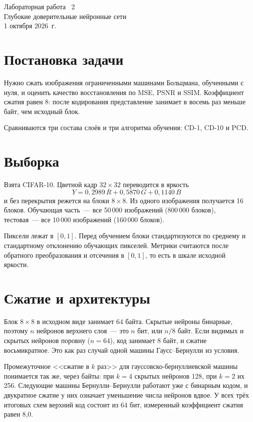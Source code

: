 \documentclass[12pt,a4paper]{article}
\begin{document}
\begin{center}
{\Large Лабораторная работа \textnumero~2}\\[0.4em]
{\large Глубокие доверительные нейронные сети}\\[0.6em]
1 октября 2026~г.
\end{center}

\section{Постановка задачи}

Нужно сжать изображения ограниченными машинами Больцмана, обученными с нуля, и оценить качество восстановления по MSE, PSNR и SSIM. Коэффициент сжатия равен 8: после кодирования представление занимает в восемь раз меньше байт, чем исходный блок.

Сравниваются три состава слоёв и три алгоритма обучения: CD-1, CD-10 и PCD.

\section{Выборка}

Взята CIFAR-10. Цветной кадр $32\times32$ переводится в яркость
\[
Y = 0{,}2989\,R + 0{,}5870\,G + 0{,}1140\,B
\]
и без перекрытия режется на блоки $8\times8$. Из одного изображения получается 16 блоков. Обучающая часть~--- все 50\,000 изображений (800\,000 блоков), тестовая~--- все 10\,000 изображений (160\,000 блоков).

Пиксели лежат в $[0,1]$. Перед обучением блоки стандартизуются по среднему и стандартному отклонению обучающих пикселей. Метрики считаются после обратного преобразования и отсечения в $[0,1]$, то есть в шкале исходной яркости.

\section{Сжатие и архитектуры}

Блок $8\times8$ в исходном виде занимает 64 байта. Скрытые нейроны бинарные, поэтому $n$ нейронов верхнего слоя~--- это $n$ бит, или $n/8$ байт. Если видимых и скрытых нейронов поровну ($n = 64$), код занимает 8 байт, и сжатие восьмикратное. Это как раз случай одной машины Гаусс--Бернулли из условия.

Промежуточное <<сжатие в $k$ раз>> для гауссовско-бернуллиевской машины понимается так же, через байты: при $k = 4$ скрытых нейронов 128, при $k = 2$ их 256. Следующие машины Бернулли--Бернулли работают уже с бинарным кодом, и двукратное сжатие у них означает уменьшение числа нейронов вдвое. У всех трёх итоговых схем верхний код состоит из 64 бит, измеренный коэффициент сжатия равен 8{,}0.
\end{document}
